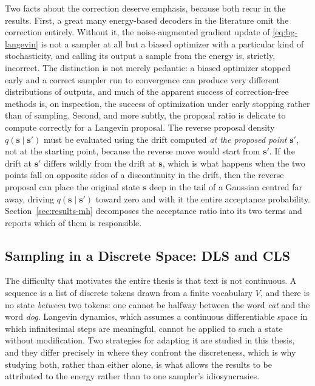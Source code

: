 Two facts about the correction deserve emphasis, because both recur in the results. First, a great many energy-based decoders in the literature omit the correction entirely. Without it, the noise-augmented gradient update of \eqref{eq:bg-langevin} is not a sampler at all but a biased optimizer with a particular kind of stochasticity, and calling its output a sample from the energy is, strictly, incorrect. The distinction is not merely pedantic: a biased optimizer stopped early and a correct sampler run to convergence can produce very different distributions of outputs, and much of the apparent success of correction-free methods is, on inspection, the success of optimization under early stopping rather than of sampling. Second, and more subtly, the proposal ratio is delicate to compute correctly for a Langevin proposal. The reverse proposal density $q(\bm{s} \mid \bm{s}')$ must be evaluated using the drift computed \emph{at the proposed point} $\bm{s}'$, not at the starting point, because the reverse move would start from $\bm{s}'$. If the drift at $\bm{s}'$ differs wildly from the drift at $\bm{s}$, which is what happens when the two points fall on opposite sides of a discontinuity in the drift, then the reverse proposal can place the original state $\bm{s}$ deep in the tail of a Gaussian centred far away, driving $q(\bm{s} \mid \bm{s}')$ toward zero and with it the entire acceptance probability. Section~\ref{sec:results-mh} decomposes the acceptance ratio into its two terms and reports which of them is responsible.

\subsection{Sampling in a Discrete Space: DLS and CLS}
\label{sec:bg-samplers}

The difficulty that motivates the entire thesis is that text is not continuous. A sequence is a list of discrete tokens drawn from a finite vocabulary $V$, and there is no state \emph{between} two tokens: one cannot be halfway between the word \emph{cat} and the word \emph{dog}. Langevin dynamics, which assumes a continuous differentiable space in which infinitesimal steps are meaningful, cannot be applied to such a state without modification. Two strategies for adapting it are studied in this thesis, and they differ precisely in where they confront the discreteness, which is why studying both, rather than either alone, is what allows the results to be attributed to the energy rather than to one sampler's idiosyncrasies.

